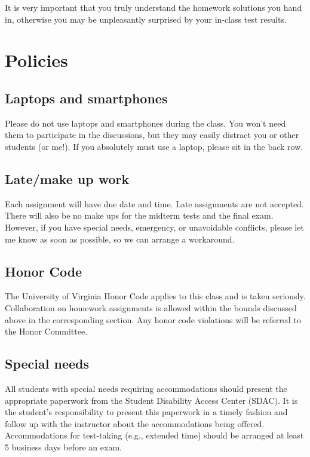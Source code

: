 \documentclass[oneside,11pt]{amsart}
\begin{document}
It is very important that you truly understand the homework solutions you hand
in, otherwise you may be unpleasantly surprised by your in-class test results.


\section{Policies}

\subsection{Laptops and smartphones}

Please do not use laptops and smartphones during the class.
You won't need them to participate in the discussions, but they may easily distract 
you or other students (or me!). If you absolutely must use a laptop, please sit in the back row.

\subsection{Late/make up work} Each assignment will have due date and time.
Late assignments are not accepted. There will also be no make ups for the midterm tests and the final exam.
However, if you have special needs, emergency, or unavoidable conflicts, please
let me know as soon as possible, so we can arrange a workaround.

\subsection{Honor Code} The University of Virginia Honor Code applies to this
class and is taken seriously. Collaboration on homework
assignments is allowed within the bounds discussed above 
in the corresponding section.
Any honor code violations will be referred to the
Honor Committee.

\subsection{Special needs}

All students with special needs requiring accommodations should present the
appropriate paperwork from the Student Disability Access Center (SDAC). It is
the student's responsibility to present this paperwork in a timely fashion and
follow up with the instructor about the accommodations being offered.
Accommodations for test-taking (e.g., extended time) should be arranged at
least 5 business days before an exam.
\end{document}
